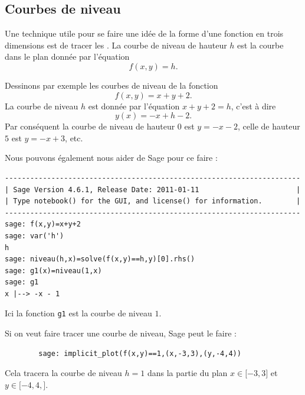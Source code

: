 \subsection{Courbes de niveau}

Une technique utile pour se faire une idée de la forme d'une fonction en trois dimensions est de tracer les . La courbe de niveau de hauteur $h$ est la courbe dans le plan donnée par l'équation
\begin{equation}
    f(x,y)=h.
\end{equation}

\begin{example}

    Dessinons par exemple les courbes de niveau de la fonction
    \begin{equation}
        f(x,y)=x+y+2.
    \end{equation}
    La courbe de niveau $h$ est donnée par l'équation $x+y+2=h$, c'est à dire
    \begin{equation}
        y(x)=-x+h-2.
    \end{equation}
    Par conséquent la courbe de niveau de hauteur $0$ est $y=-x-2$, celle de hauteur $5$ est $y=-x+3$, etc.

    Nous pouvons également nous aider de Sage pour ce faire :
    \begin{verbatim}
----------------------------------------------------------------------
| Sage Version 4.6.1, Release Date: 2011-01-11                       |
| Type notebook() for the GUI, and license() for information.        |
----------------------------------------------------------------------
sage: f(x,y)=x+y+2
sage: var('h')
h
sage: niveau(h,x)=solve(f(x,y)==h,y)[0].rhs()
sage: g1(x)=niveau(1,x)
sage: g1
x |--> -x - 1
    \end{verbatim}
    Ici la fonction \verb+g1+ est la courbe de niveau $1$.

    Si on veut faire tracer une courbe de niveau, Sage peut le faire :
    \begin{verbatim}
        sage: implicit_plot(f(x,y)==1,(x,-3,3),(y,-4,4))
    \end{verbatim}
    Cela tracera la courbe de niveau $h=1$ dans la partie du plan $x\in\mathopen[ -3 , 3 \mathclose]$ et $y\in\mathopen[ -4,4 ,  \mathclose]$.

\end{example}

